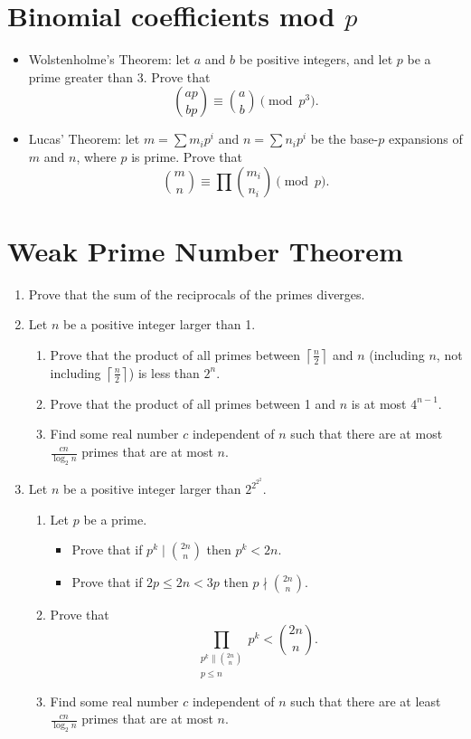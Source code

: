 \documentclass{article}
\begin{document}
\section{Binomial coefficients mod $p$}
\begin{itemize}
  \item Wolstenholme's Theorem:
    let $a$ and $b$ be positive integers, and let $p$ be a prime greater
    than 3. Prove that \[\binom{ap}{bp}\equiv\binom ab\pmod {p^3}.\]
  \item Lucas' Theorem: let $m=\sum m_i p^i$ and $n=\sum n_i p^i$ be the base-$p$ expansions of
    $m$ and $n$, where $p$ is prime. Prove that
    \[\binom mn\equiv\prod{\binom{m_i}{n_i}}\pmod p.\]
\end{itemize}
\section{Weak Prime Number Theorem}
\begin{enumerate}
  \item Prove that the sum of the reciprocals of the primes diverges.
  \item
    Let $n$ be a positive integer larger than 1.
    \begin{enumerate}
      \item Prove that the product of all primes between $\left\lceil\frac
        n2\right\rceil$ and $n$
        (including $n$, not including $\left\lceil\frac n2\right\rceil$)
        is less than
        $2^n$.
      \item Prove that the product of all primes between 1 and $n$ is at most
        $4^{n-1}$.
      \item Find some real number $c$ independent of $n$ such that there are at
        most $\frac{cn}{\log_2 n}$ primes that are at most $n$.
    \end{enumerate}
  \item 
    Let $n$ be a positive integer larger than $2^{2^{2^2}}$.
    \begin{enumerate}
      \item Let $p$ be a prime.
        \begin{itemize}
          \item Prove that if $p^k\mid\binom{2n}n$ then $p^k<
            2n$.
          \item Prove that if $2p\le 2n< 3p$ then $p\nmid\binom{2n}n$.
        \end{itemize}
      \item Prove that 
        \[\prod_{\substack{p^k\|\binom{2n}n\\ p\le n}}p^k<\binom{2n}n.\]
      \item Find some real number $c$ independent of $n$ such that there are at
        least $\frac{cn}{\log_2 n}$ primes that are at most $n$.
    \end{enumerate} 
\end{enumerate}
\end{document}
